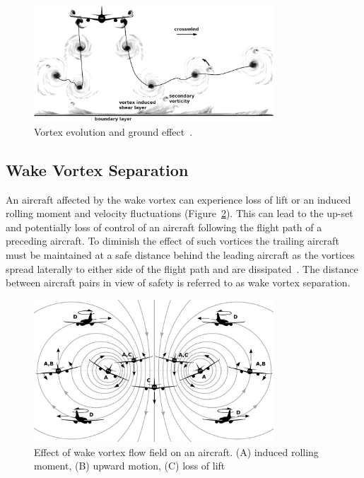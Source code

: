 \begin{figure}[h]
    \centering
    \includegraphics[width=0.8\textwidth]{graphics/Hallock_vortex_evolution.jpg}
    \caption[Wake vortex and ground effect]{Vortex evolution and ground effect~\cite[p. 29]{Hallock2018Apr}.} \label{fig:vortex_ground_effect}
\end{figure}


\subsection{Wake Vortex Separation}
An aircraft affected by the wake vortex can experience loss of lift or an induced rolling moment and velocity fluctuations (Figure~\ref{fig:vortex_encounter}).
This can lead to the up-set and potentially loss of control of an aircraft following the flight path of a preceding aircraft.
To diminish the effect of such vortices the trailing aircraft must be maintained at a safe distance behind the leading aircraft as the vortices spread laterally to either side of the flight path and are dissipated~\cite{Breitsamter2011Feb}.
The distance between aircraft pairs in view of safety is referred to as wake vortex separation. 

\begin{figure}[h]
    \centering
    \includegraphics[width=0.8\textwidth]{graphics/reaction_in_wake.jpg}
    \caption[Wake vortex encounter]{Effect of wake vortex flow field on an aircraft. (A) induced rolling moment, (B) upward motion, (C) loss of lift~\cite[p. 33]{Hallock2018Apr}} \label{fig:vortex_encounter}
\end{figure}

